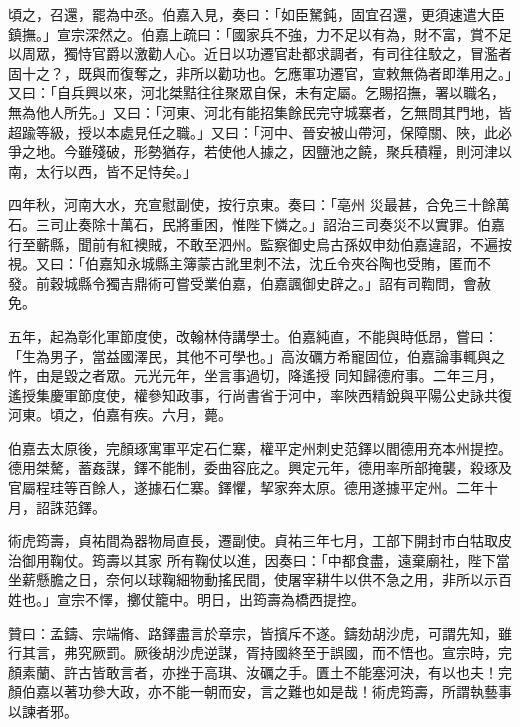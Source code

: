 \begin{pinyinscope}
 頃之，召還，罷為中丞。伯嘉入見，奏曰：「如臣駑鈍，固宜召還，更須速遣大臣鎮撫。」宣宗深然之。伯嘉上疏曰：「國家兵不強，力不足以有為，財不富，賞不足
 以周眾，獨恃官爵以激勸人心。近日以功遷官赴都求調者，有司往往駮之，冒濫者固十之？，既與而復奪之，非所以勸功也。乞應軍功遷官，宣敕無偽者即準用之。」又曰：「自兵興以來，河北桀黠往往聚眾自保，未有定屬。乞賜招撫，署以職名，無為他人所先。」又曰：「河東、河北有能招集餘民完守城寨者，乞無問其門地，皆超踰等級，授以本處見任之職。」又曰：「河中、晉安被山帶河，保障關、陜，此必爭之地。今雖殘破，形勢猶存，若使他人據之，因鹽池之饒，聚兵積糧，則河津以南，太行以西，皆不足恃矣。」



 四年秋，河南大水，充宣慰副使，按行京東。奏曰：「亳州
 災最甚，合免三十餘萬石。三司止奏除十萬石，民將重困，惟陛下憐之。」詔治三司奏災不以實罪。伯嘉行至蘄縣，聞前有紅襖賊，不敢至泗州。監察御史烏古孫奴申劾伯嘉違詔，不遍按視。又曰：「伯嘉知永城縣主簿蒙古訛里刺不法，沈丘令夾谷陶也受賄，匿而不發。前穀城縣令獨吉鼎術可嘗受業伯嘉，伯嘉諷御史辟之。」詔有司鞫問，會赦免。



 五年，起為彰化軍節度使，改翰林侍講學士。伯嘉純直，不能與時低昂，嘗曰：「生為男子，當益國澤民，其他不可學也。」高汝礪方希寵固位，伯嘉論事輒與之忤，由是毀之者眾。元光元年，坐言事過切，降遙授
 同知歸德府事。二年三月，遙授集慶軍節度使，權參知政事，行尚書省于河中，率陜西精銳與平陽公史詠共復河東。頃之，伯嘉有疾。六月，薨。



 伯嘉去太原後，完顏琢寓軍平定石仁寨，權平定州刺史范鐸以閻德用充本州提控。德用桀驁，蓄姦謀，鐸不能制，委曲容庇之。興定元年，德用率所部掩襲，殺琢及官屬程珪等百餘人，遂據石仁寨。鐸懼，挈家奔太原。德用遂據平定州。二年十月，詔誅范鐸。



 術虎筠壽，貞祐間為器物局直長，遷副使。貞祐三年七月，工部下開封市白牯取皮治御用鞠仗。筠壽以其家
 所有鞠仗以進，因奏曰：「中都食盡，遠棄廟社，陛下當坐薪懸膽之日，奈何以球鞠細物動搖民間，使屠宰耕牛以供不急之用，非所以示百姓也。」宣宗不懌，擲仗籠中。明日，出筠壽為橋西提控。



 贊曰：孟鑄、宗端脩、路鐸盡言於章宗，皆擯斥不遂。鑄劾胡沙虎，可謂先知，雖行其言，弗究厥罰。厥後胡沙虎逆謀，胥持國終至于誤國，而不悟也。宣宗時，完顏素蘭、許古皆敢言者，亦挫于高琪、汝礪之手。匱土不能塞河決，有以也夫！完顏伯嘉以著功參大政，亦不能一朝而安，言之難也如是哉！術虎筠壽，所謂執藝事以諫者邪。




\end{pinyinscope}
